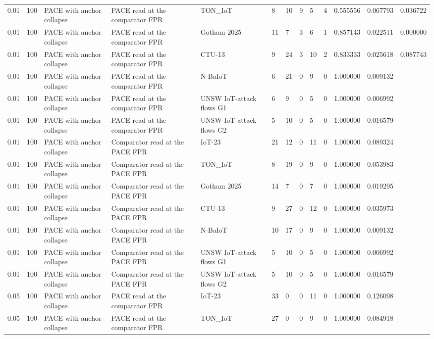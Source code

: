 \begin{tabular}{lllllllllllll}
0.01 & 100 & PACE with anchor collapse & PACE read at the comparator FPR & TON\_IoT & 8 & 10 & 9 & 5 & 4 & 0.555556 & 0.067793 & 0.036722 \\
0.01 & 100 & PACE with anchor collapse & PACE read at the comparator FPR & Gotham 2025 & 11 & 7 & 3 & 6 & 1 & 0.857143 & 0.022511 & 0.000000 \\
0.01 & 100 & PACE with anchor collapse & PACE read at the comparator FPR & CTU-13 & 9 & 24 & 3 & 10 & 2 & 0.833333 & 0.025618 & 0.087743 \\
0.01 & 100 & PACE with anchor collapse & PACE read at the comparator FPR & N-BaIoT & 6 & 21 & 0 & 9 & 0 & 1.000000 & 0.009132 &  \\
0.01 & 100 & PACE with anchor collapse & PACE read at the comparator FPR & UNSW IoT-attack flows G1 & 6 & 9 & 0 & 5 & 0 & 1.000000 & 0.006992 &  \\
0.01 & 100 & PACE with anchor collapse & PACE read at the comparator FPR & UNSW IoT-attack flows G2 & 5 & 10 & 0 & 5 & 0 & 1.000000 & 0.016579 &  \\
0.01 & 100 & PACE with anchor collapse & Comparator read at the PACE FPR & IoT-23 & 21 & 12 & 0 & 11 & 0 & 1.000000 & 0.089324 &  \\
0.01 & 100 & PACE with anchor collapse & Comparator read at the PACE FPR & TON\_IoT & 8 & 19 & 0 & 9 & 0 & 1.000000 & 0.053983 &  \\
0.01 & 100 & PACE with anchor collapse & Comparator read at the PACE FPR & Gotham 2025 & 14 & 7 & 0 & 7 & 0 & 1.000000 & 0.019295 &  \\
0.01 & 100 & PACE with anchor collapse & Comparator read at the PACE FPR & CTU-13 & 9 & 27 & 0 & 12 & 0 & 1.000000 & 0.035973 &  \\
0.01 & 100 & PACE with anchor collapse & Comparator read at the PACE FPR & N-BaIoT & 10 & 17 & 0 & 9 & 0 & 1.000000 & 0.009132 &  \\
0.01 & 100 & PACE with anchor collapse & Comparator read at the PACE FPR & UNSW IoT-attack flows G1 & 5 & 10 & 0 & 5 & 0 & 1.000000 & 0.006992 &  \\
0.01 & 100 & PACE with anchor collapse & Comparator read at the PACE FPR & UNSW IoT-attack flows G2 & 5 & 10 & 0 & 5 & 0 & 1.000000 & 0.016579 &  \\
0.05 & 100 & PACE with anchor collapse & PACE read at the comparator FPR & IoT-23 & 33 & 0 & 0 & 11 & 0 & 1.000000 & 0.126098 &  \\
0.05 & 100 & PACE with anchor collapse & PACE read at the comparator FPR & TON\_IoT & 27 & 0 & 0 & 9 & 0 & 1.000000 & 0.084918 &  \\

\end{tabular}
